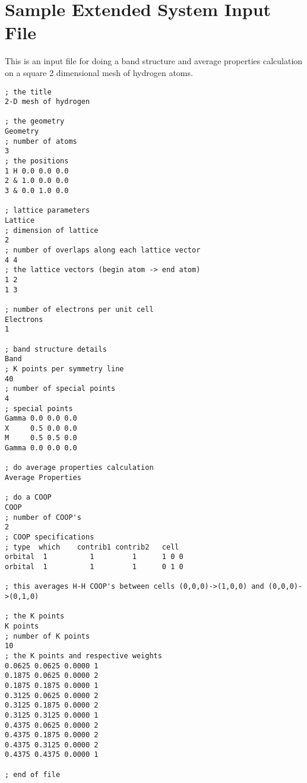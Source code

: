 
\chapter{Sample Extended System Input File}

This is an input file for doing a band structure and average
properties calculation on a square 2 dimensional mesh of hydrogen
atoms.

\vspace{0.25in}

\shrinkspacing
\begin{verbatim}
; the title
2-D mesh of hydrogen

; the geometry
Geometry
; number of atoms
3
; the positions
1 H 0.0 0.0 0.0
2 & 1.0 0.0 0.0
3 & 0.0 1.0 0.0

; lattice parameters
Lattice
; dimension of lattice
2
; number of overlaps along each lattice vector
4 4
; the lattice vectors (begin atom -> end atom)
1 2
1 3

; number of electrons per unit cell
Electrons
1

; band structure details
Band
; K points per symmetry line
40
; number of special points
4
; special points
Gamma 0.0 0.0 0.0
X     0.5 0.0 0.0
M     0.5 0.5 0.0
Gamma 0.0 0.0 0.0

; do average properties calculation
Average Properties

; do a COOP
COOP
; number of COOP's
2
; COOP specifications
; type  which    contrib1 contrib2   cell
orbital  1          1         1      1 0 0
orbital  1          1         1      0 1 0

; this averages H-H COOP's between cells (0,0,0)->(1,0,0) and (0,0,0)->(0,1,0)

; the K points
K points
; number of K points
10
; the K points and respective weights
0.0625 0.0625 0.0000 1
0.1875 0.0625 0.0000 2
0.1875 0.1875 0.0000 1
0.3125 0.0625 0.0000 2
0.3125 0.1875 0.0000 2
0.3125 0.3125 0.0000 1
0.4375 0.0625 0.0000 2
0.4375 0.1875 0.0000 2
0.4375 0.3125 0.0000 2
0.4375 0.4375 0.0000 1

; end of file
\end{verbatim}
\resumespacing

